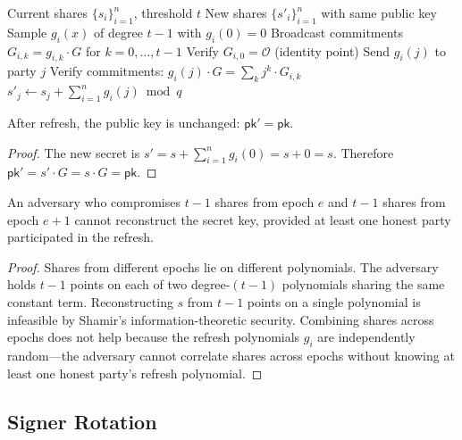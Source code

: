 \begin{algorithm}[H]
\caption{Proactive Key Refresh}
\label{alg:refresh}
\begin{algorithmic}[1]
\Require Current shares $\{s_i\}_{i=1}^n$, threshold $t$
\Ensure New shares $\{s'_i\}_{i=1}^n$ with same public key
  \State Sample $g_i(x)$ of degree $t-1$ with $g_i(0) = 0$
  \State Broadcast commitments $G_{i,k} = g_{i,k} \cdot G$ for $k = 0, \ldots, t-1$
  \State Verify $G_{i,0} = \mathcal{O}$ (identity point) 
  \State Send $g_i(j)$ to party $j$
\EndFor
{}
  \State Verify commitments: $g_i(j) \cdot G = \sum_k j^k \cdot G_{i,k}$
  \State $s'_j \gets s_j + \sum_{i=1}^n g_i(j) \bmod q$
\EndFor
\end{algorithmic}
\end{algorithm}

\begin{lemma}
\label{lem:refresh-pk}
After refresh, the public key is unchanged: $\mathsf{pk}' = \mathsf{pk}$.
\end{lemma}

\begin{proof}
The new secret is $s' = s + \sum_{i=1}^n g_i(0) = s + 0 = s$. Therefore
$\mathsf{pk}' = s' \cdot G = s \cdot G = \mathsf{pk}$.
\end{proof}

\begin{lemma}
\label{lem:forward-sec}
An adversary who compromises $t-1$ shares from epoch $e$ and $t-1$ shares from
epoch $e+1$ cannot reconstruct the secret key, provided at least one honest party
participated in the refresh.
\end{lemma}

\begin{proof}
Shares from different epochs lie on different polynomials. The adversary holds
$t-1$ points on each of two degree-$(t-1)$ polynomials sharing the same constant
term. Reconstructing $s$ from $t-1$ points on a single polynomial is infeasible
by Shamir's information-theoretic security. Combining shares across epochs does not
help because the refresh polynomials $g_i$ are independently random---the adversary
cannot correlate shares across epochs without knowing at least one honest party's
refresh polynomial.
\end{proof}

\subsection{Signer Rotation}
\label{sec:rotation}

